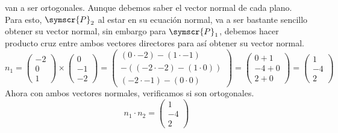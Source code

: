 \documentclass{article}
\def\fancyP{\symscr{P}}
\begin{document}
\begin{enumerate}
\begin{itemize}
\begin{itemize}
                    van a ser ortogonales. Aunque debemos saber el vector normal de cada plano. Para esto, \(\fancyP_2\) al estar en su ecuación normal,
                    va a ser bastante sencillo obtener su vector normal, sin embargo para \(\fancyP_1\), debemos hacer producto cruz entre ambos vectores directores
                    para así obtener su vector normal.
                    \[
                        n_1 = 
                        \begin{pmatrix}
                            -2 \\ 0 \\ 1
                        \end{pmatrix}
                        \times
                        \begin{pmatrix}
                            0 \\ -1 \\ -2
                        \end{pmatrix}
                        =
                        \begin{pmatrix}
                            (0 \cdot -2) - (1 \cdot -1) \\
                            -( (-2 \cdot -2) - (1 \cdot 0) ) \\
                            (-2 \cdot -1) - (0 \cdot 0)
                        \end{pmatrix}
                        =
                        \begin{pmatrix}
                            0 + 1 \\
                            -4 + 0 \\
                            2 + 0
                        \end{pmatrix}
                        =
                        \begin{pmatrix}
                            1 \\ -4 \\ 2
                        \end{pmatrix}
                    \]
                    Ahora con ambos vectores normales, verificamos si son ortogonales.
                    \[
                        n_1 \cdot n_2 
                        =
                        \begin{pmatrix}
                            1 \\ -4 \\ 2
                        \end{pmatrix}
\]
\end{itemize}
\end{itemize}
\end{enumerate}
\end{document}

